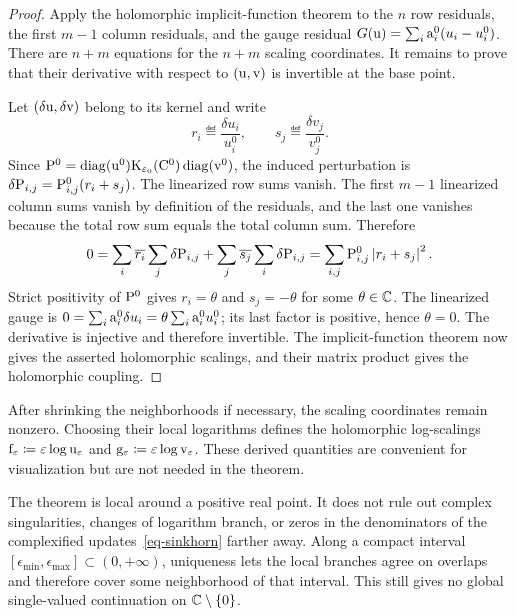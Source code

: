 \begin{proof}
	Apply the holomorphic implicit-function theorem to the $n$ row residuals, the first $m-1$ column residuals, and the gauge residual $G(\uD)=\sum_i\a_i^0(u_i-u_i^0)$. There are $n+m$ equations for the $n+m$ scaling coordinates. It remains to prove that their derivative with respect to $(\uD,\vD)$ is invertible at the base point.

	Let $(\delta\uD,\delta\vD)$ belong to its kernel and write
	\[
		r_i\eqdef\frac{\delta u_i}{u_i^0},
		\qquad
		s_j\eqdef\frac{\delta v_j}{v_j^0}.
	\]
	Since $\P^0=\diag(\uD^0)\K_{\epsilon_0}(\C^0)\diag(\vD^0)$, the induced perturbation is $\delta\P_{i,j}=\P^0_{i,j}(r_i+s_j)$.
	The linearized row sums vanish. The first $m-1$ linearized column sums vanish by definition of the residuals, and the last one vanishes because the total row sum equals the total column sum. Therefore
	\[
		0
		=
		\sum_i \overline{r_i}\sum_j\delta \P_{i,j}
		+
		\sum_j \overline{s_j}\sum_i\delta \P_{i,j}
		=
		\sum_{i,j}\P^0_{i,j}\abs{r_i+s_j}^2.
	\]
	Strict positivity of $\P^0$ gives $r_i=\theta$ and $s_j=-\theta$ for some $\theta\in\CC$. The linearized gauge is $0=\sum_i\a_i^0\delta u_i=\theta\sum_i\a_i^0u_i^0$; its last factor is positive, hence $\theta=0$. The derivative is injective and therefore invertible. The implicit-function theorem now gives the asserted holomorphic scalings, and their matrix product gives the holomorphic coupling.
\end{proof}

After shrinking the neighborhoods if necessary, the scaling coordinates remain nonzero. Choosing their local logarithms defines the holomorphic log-scalings $\fD_\epsilon\eqdef\epsilon\log\uD_\epsilon$ and $\gD_\epsilon\eqdef\epsilon\log\vD_\epsilon$. These derived quantities are convenient for visualization but are not needed in the theorem.

\begin{rem}
	The theorem is local around a positive real point. It does not rule out complex singularities, changes of logarithm branch, or zeros in the denominators of the complexified updates~\eqref{eq-sinkhorn} farther away. Along a compact interval $[\epsilon_{\min},\epsilon_{\max}]\subset(0,+\infty)$, uniqueness lets the local branches agree on overlaps and therefore cover some neighborhood of that interval. This still gives no global single-valued continuation on $\CC\setminus\{0\}$.
\end{rem}

